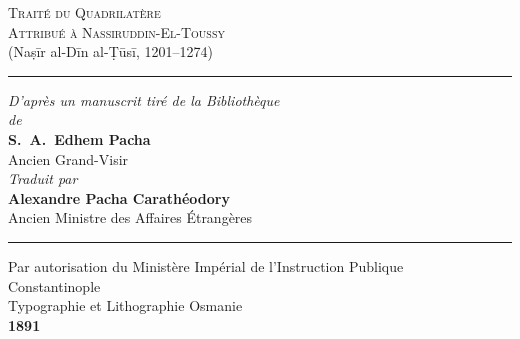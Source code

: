 \documentclass[11pt,a4paper]{article}
\theoremstyle{plain}
\theoremstyle{definition}
\theoremstyle{remark}
\newcommand{\shortline}{\noindent\rule{0.5\textwidth}{0.4pt}\par}
\begin{document}



\thispagestyle{empty}

\begin{center}

\vspace*{2cm}



{\fontsize{28}{34}\selectfont\textsc{Traité du Quadrilatère}}\\[0.8cm]

{\Large\textsc{Attribué à Nassiruddin-El-Toussy}}\\[0.3cm]

{\large (Naṣīr al-Dīn al-Ṭūsī, 1201–1274)}\\[1cm]



\shortline



\vspace{0.8cm}

{\large\textit{D'après un manuscrit tiré de la Bibliothèque}}\\[0.2cm]

{\large\textit{de}}\\[0.2cm]

{\large\textbf{S.~A.~Edhem Pacha}}\\[0.1cm]

{\normalsize Ancien Grand-Visir}\\[0.6cm]



{\large\textit{Traduit par}}\\[0.2cm]

{\Large\textbf{Alexandre Pacha Carathéodory}}\\[0.1cm]

{\normalsize Ancien Ministre des Affaires Étrangères}\\[1.2cm]



\shortline



\vspace{0.5cm}

{\small Par autorisation du Ministère Impérial de l'Instruction Publique}\\[1.5cm]



{\Large Constantinople}\\[0.2cm]

{Typographie et Lithographie Osmanie}\\[0.3cm]

{\large\textbf{1891}}\\[2cm]



\end{center}
\end{document}
